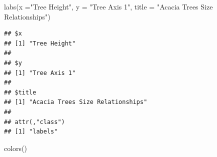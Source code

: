 \documentclass[
]{article}
\newenvironment{Shaded}{\begin{snugshade}}{\end{snugshade}}
\newcommand{\AttributeTok}[1]{\textcolor[rgb]{0.77,0.63,0.00}{#1}}
\newcommand{\FunctionTok}[1]{\textcolor[rgb]{0.00,0.00,0.00}{#1}}
\newcommand{\NormalTok}[1]{#1}
\newcommand{\StringTok}[1]{\textcolor[rgb]{0.31,0.60,0.02}{#1}}
\begin{document}
\begin{Shaded}
\begin{Highlighting}[]
\FunctionTok{labs}\NormalTok{(}\AttributeTok{x =}\StringTok{"Tree Height"}\NormalTok{, }\AttributeTok{y =} \StringTok{"Tree Axis 1"}\NormalTok{, }\AttributeTok{title =} \StringTok{"Acacia Trees Size Relationships"}\NormalTok{)}
\end{Highlighting}
\end{Shaded}

\begin{verbatim}
## $x
## [1] "Tree Height"
## 
## $y
## [1] "Tree Axis 1"
## 
## $title
## [1] "Acacia Trees Size Relationships"
## 
## attr(,"class")
## [1] "labels"
\end{verbatim}

\begin{Shaded}
\begin{Highlighting}[]
\FunctionTok{colors}\NormalTok{()}
\end{Highlighting}
\end{Shaded}
\end{document}
